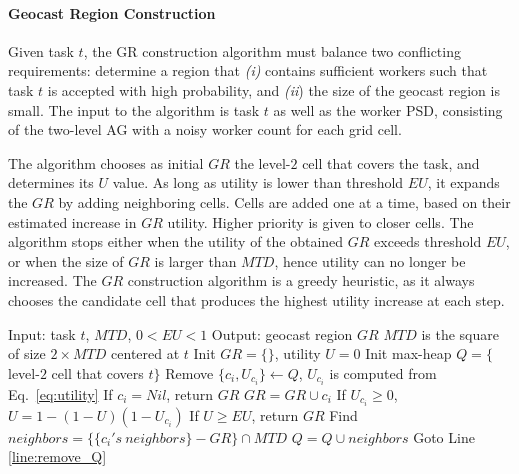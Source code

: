 \documentclass{USC-Thesis}
\renewcommand{\sc}{\textsc}
\numberwithin{equation}{chapter}
\begin{document}
\paragraph{Geocast Region Construction}
\label{sec:greedy}

Given task $t$, the GR construction algorithm must balance two conflicting requirements: determine a region that {\em (i)} contains sufficient workers such that task $t$ is accepted with high probability, and {\em (ii}) the size of the geocast region is small. The input to the algorithm is task $t$ as well as the worker PSD, consisting of the two-level AG with a noisy worker count for each grid cell.

The algorithm chooses as initial $\mathit{GR}$ the level-$2$ cell that covers the task, and determines its $U$ value. As long as utility is lower than threshold $\mathit{EU}$, it expands the $\mathit{GR}$ by adding neighboring cells. Cells are added one at a time, based on their estimated increase in $\mathit{GR}$ utility. 
Higher priority is given to closer cells. The algorithm stops either when the utility of the obtained $\mathit{GR}$ exceeds threshold $\mathit{EU}$, or when the size of $\mathit{GR}$ is larger than $\mathit{MTD}$, hence utility can no longer be increased. The $\mathit{GR}$ construction algorithm is a greedy heuristic, as it always chooses the candidate cell that produces the highest utility increase at each step.

\begin{algorithm} [ht]
\caption{\sc Greedy Algorithm (GDY)}
\small
\begin{algorithmic}[1]
\STATE Input: task $t$, $\mathit{MTD}$, $0$$<$$\mathit{EU}$$<$$1$%
\STATE Output: geocast region $\mathit{GR}$
\STATE $\mathit{MTD}$ is the square of size $2 \times \mathit{MTD}$ centered at $t$
\STATE Init $\mathit{GR}=\{\}$, utility $U=0$
\STATE Init max-heap $Q=\{$level-$2$ cell that covers $t\}$ \label{line:init_Q}
\STATE Remove $\{c_i,U_{c_i}\}\leftarrow Q$, $U_{c_i}$ is computed from Eq.~\eqref{eq:utility} \label{line:remove_Q}
\STATE If $c_i=Nil$, return $\mathit{GR}$ 
\STATE $\mathit{GR=GR}\cup c_i$ \label{line:update_q}
\STATE If $U_{c_i}\ge 0$, $U=1-(1-U)(1-U_{c_i})$ \label{line:update_u_inc}
\STATE If $U\ge EU$, return $\mathit{GR}$ \label{line:return_u}
\STATE Find $\mathit{neighbors} = \{\{{c_i}'s\ \mathit{neighbors\}}-\mathit{GR}\} \cap \mathit{MTD}$ \label{line:new_neighbors}
\STATE $Q=Q\cup \mathit{neighbors}$ \label{line:update_heap}
\STATE Goto Line \ref{line:remove_Q}
\end{algorithmic}
\label{alg:geocast}
\end{algorithm}
\end{document}
